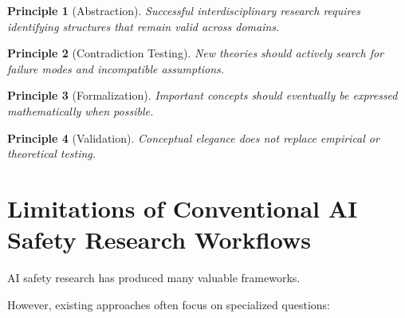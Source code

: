 \documentclass[11pt]{article}
\newtheorem{principle}{Principle}
\begin{document}
\begin{principle}[Abstraction]


Successful interdisciplinary research requires identifying structures
that remain valid across domains.


\end{principle}



\begin{principle}[Contradiction Testing]


New theories should actively search for failure modes and incompatible
assumptions.


\end{principle}



\begin{principle}[Formalization]


Important concepts should eventually be expressed mathematically when
possible.


\end{principle}



\begin{principle}[Validation]


Conceptual elegance does not replace empirical or theoretical testing.


\end{principle}



\section{Limitations of Conventional AI Safety Research Workflows}


AI safety research has produced many valuable frameworks.


However, existing approaches often focus on specialized questions:
\end{document}
